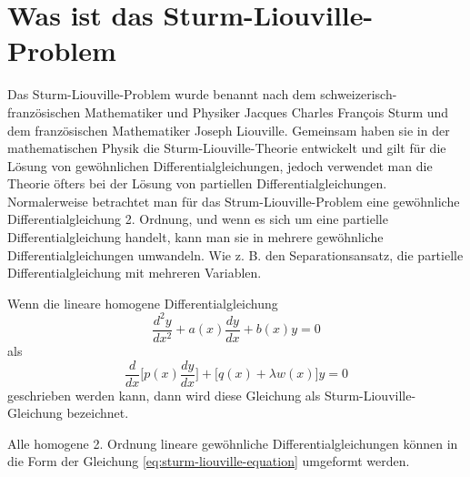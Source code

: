 %
%
%
\section{Was ist das Sturm-Liouville-Problem\label{sturmliouville:section:teil0}}
Das Sturm-Liouville-Problem wurde benannt nach dem schweizerisch-französischen Mathematiker und Physiker Jacques Charles Fran\c{c}ois Sturm und dem französischen Mathematiker Joseph Liouville.
Gemeinsam haben sie in der mathematischen Physik die Sturm-Liouville-Theorie entwickelt und gilt für die Lösung von gewöhnlichen Differentialgleichungen, jedoch verwendet man die Theorie öfters bei der Lösung von partiellen Differentialgleichungen.
Normalerweise betrachtet man für das Strum-Liouville-Problem eine gewöhnliche Differentialgleichung 2. Ordnung, und wenn es sich um eine partielle Differentialgleichung handelt, kann man sie in mehrere gewöhnliche Differentialgleichungen umwandeln. Wie z. B. den Separationsansatz, die partielle Differentialgleichung mit mehreren Variablen.

\begin{definition}
Wenn die lineare homogene Differentialgleichung
\begin{equation}
	\frac{d^2y}{dx^2} + a(x)\frac{dy}{dx} + b(x)y = 0
\end{equation}
als
\begin{equation}
	\label{eq:sturm-liouville-equation}
	\frac{d}{dx}\lbrack p(x) \frac{dy}{dx} \rbrack + \lbrack q(x) + \lambda w(x) \rbrack y = 0 
\end{equation}
geschrieben werden kann, dann wird diese Gleichung als Sturm-Liouville-Gleichung bezeichnet.
\end{definition}
Alle homogene 2. Ordnung lineare gewöhnliche Differentialgleichungen können in die Form der Gleichung \ref{eq:sturm-liouville-equation} umgeformt werden.

